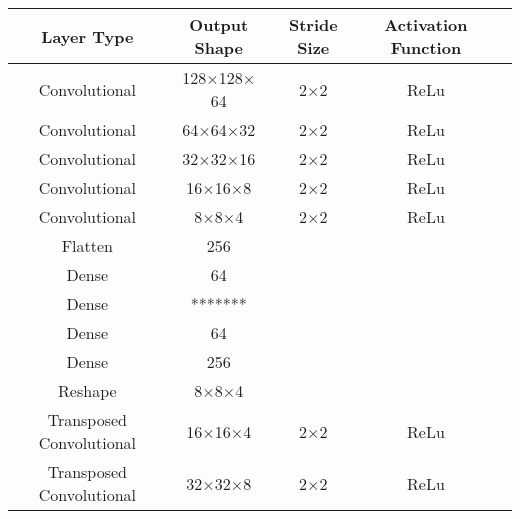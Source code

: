 \documentclass[12pt, onecolumn]{article}
\begin{document}
        \begin{table}[H]
            \centering

            \begin{tabular}{c c c c c}
                
                Layer Type & Output Shape & Stride Size & Activation Function  \\
    
                \hline\hline
                
                Convolutional & 128$\times$128$\times$64 & 2$\times$2 & ReLu \\
    
                Convolutional & 64$\times$64$\times$32 & 2$\times$2 & ReLu \\
    
                Convolutional & 32$\times$32$\times$16 & 2$\times$2 & ReLu \\
    
                Convolutional & 16$\times$16$\times$8 & 2$\times$2 & ReLu \\
    
                Convolutional & 8$\times$8$\times$4 & 2$\times$2 & ReLu \\
    
                Flatten & 256 & & \\

                Dense & 64 & & \\
                
                Dense & ******* & & \\
    
                \hline
    
                Dense & 64 & & \\
    
                Dense & 256 & & \\
    
                Reshape & 8$\times$8$\times$4 & & \\
    
                Transposed Convolutional & 16$\times$16$\times$4 & 2$\times$2 & ReLu \\
    
                Transposed Convolutional & 32$\times$32$\times$8 & 2$\times$2 & ReLu \\
    

\end{tabular}
\end{table}
\end{document}
